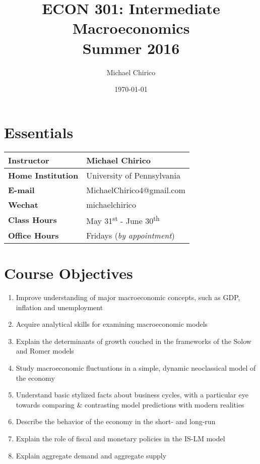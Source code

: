 \documentclass{article}
\begin{document}
\title{ECON 301: Intermediate Macroeconomics \\ Summer 2016}

\author{Michael Chirico}

\date{\today}

\maketitle

\section*{Essentials}

\begin{table}[h]
\centering
\begin{tabular}{|l|l|}
\hline
\textbf{Instructor} & Michael Chirico \\
\hline
\textbf{Home Institution} & University of Pennsylvania \\
\hline
\textbf{E-mail} & MichaelChirico4@gmail.com \\
\hline
\textbf{Wechat} & michaelchirico \\
\hline
\textbf{Class Hours} & May 31\textsuperscript{st} - June 30\textsuperscript{th} \\
\hline
\textbf{Office Hours} & Fridays (\textit{by appointment}) \\
\hline
\end{tabular}
\end{table}

\section*{Course Objectives}

\begin{enumerate}
\item Improve understanding of major macroeconomic concepts, such as GDP, inflation and unemployment
\item Acquire analytical skills for examining macroeconomic models
\item Explain the determinants of growth couched in the frameworks of the Solow and Romer models
\item Study macroeconomic fluctuations in a simple, dynamic neoclassical model of the economy
\item Understand basic stylized facts about business cycles, with a particular eye towards comparing \& contrasting model predictions with modern realities
\item Describe the behavior of the economy in the short- and long-run
\item Explain the role of fiscal and monetary policies in the IS-LM model
\item Explain aggregate demand and aggregate supply
\end{enumerate}
\end{document}
